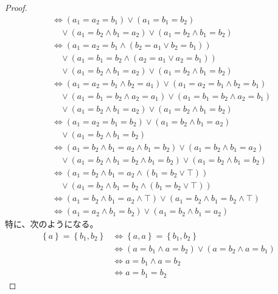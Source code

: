\documentclass[a4paper]{jsarticle}
\begin{document}
\begin{proof}
\begin{align*}
&\Leftrightarrow \left( a_{1} = a_{2} = b_{1} \right) \vee \left( a_{1} = b_{1} = b_{2} \right) \\
&\quad \vee \left( a_{1} = b_{2} \land b_{1} = a_{2} \right) \vee \left( a_{1} = b_{2} \land b_{1} = b_{2} \right) \\
&\Leftrightarrow \left( a_{1} = a_{2} = b_{1} \land \left( b_{2} = a_{1} \vee b_{2} = b_{1} \right) \right) \\ 
&\quad \vee \left( a_{1} = b_{1} = b_{2} \land \left( a_{2} = a_{1} \vee a_{2} = b_{1} \right) \right) \\
&\quad \vee \left( a_{1} = b_{2} \land b_{1} = a_{2} \right) \vee \left( a_{1} = b_{2} \land b_{1} = b_{2} \right) \\
&\Leftrightarrow \left( a_{1} = a_{2} = b_{1} \land b_{2} = a_{1} \right) \vee \left( a_{1} = a_{2} = b_{1} \land b_{2} = b_{1} \right) \\
&\quad \vee \left( a_{1} = b_{1} = b_{2} \land a_{2} = a_{1} \right) \vee \left( a_{1} = b_{1} = b_{2} \land a_{2} = b_{1} \right) \\
&\quad \vee \left( a_{1} = b_{2} \land b_{1} = a_{2} \right) \vee \left( a_{1} = b_{2} \land b_{1} = b_{2} \right) \\
&\Leftrightarrow \left( a_{1} = a_{2} = b_{1} = b_{2} \right) \vee \left( a_{1} = b_{2} \land b_{1} = a_{2} \right) \\
&\quad \vee \left( a_{1} = b_{2} \land b_{1} = b_{2} \right) \\
&\Leftrightarrow \left( a_{1} = b_{2} \land b_{1} = a_{2} \land b_{1} = b_{2} \right) \vee \left( a_{1} = b_{2} \land b_{1} = a_{2} \right) \\
&\quad \vee \left( a_{1} = b_{2} \land b_{1} = b_{2} \land b_{1} = b_{2} \right) \vee \left( a_{1} = b_{2} \land b_{1} = b_{2} \right) \\
&\Leftrightarrow \left( a_{1} = b_{2} \land b_{1} = a_{2} \land \left( b_{1} = b_{2} \vee \top \right) \right) \\
&\quad \vee \left( a_{1} = b_{2} \land b_{1} = b_{2} \land \left( b_{1} = b_{2} \vee \top \right) \right) \\
&\Leftrightarrow \left( a_{1} = b_{2} \land b_{1} = a_{2} \land \top \right) \vee \left( a_{1} = b_{2} \land b_{1} = b_{2} \land \top \right) \\
&\Leftrightarrow \left( a_{1} = a_{2} \land b_{1} = b_{2} \right) \vee \left( a_{1} = b_{2} \land b_{1} = a_{2} \right)
\end{align*}
特に、次のようになる。
\begin{align*}
\left\{ a \right\} = \left\{ b_{1},b_{2} \right\} &\Leftrightarrow \left\{ a,a \right\} = \left\{ b_{1},b_{2} \right\} \\ 
&\Leftrightarrow \left( a = b_{1} \land a = b_{2} \right) \vee \left( a = b_{2} \land a = b_{1} \right) \\
&\Leftrightarrow a = b_{1} \land a = b_{2} \\
&\Leftrightarrow a = b_{1} = b_{2}
\end{align*}
\end{proof}
\end{document}
